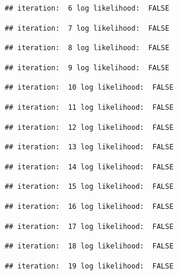 \documentclass[
]{article}
\begin{document}
\begin{lstlisting}
## iteration:  6 log likelihood:  FALSE
\end{lstlisting}

\begin{lstlisting}
## iteration:  7 log likelihood:  FALSE
\end{lstlisting}

\begin{lstlisting}
## iteration:  8 log likelihood:  FALSE
\end{lstlisting}

\begin{lstlisting}
## iteration:  9 log likelihood:  FALSE
\end{lstlisting}

\begin{lstlisting}
## iteration:  10 log likelihood:  FALSE
\end{lstlisting}

\begin{lstlisting}
## iteration:  11 log likelihood:  FALSE
\end{lstlisting}

\begin{lstlisting}
## iteration:  12 log likelihood:  FALSE
\end{lstlisting}

\begin{lstlisting}
## iteration:  13 log likelihood:  FALSE
\end{lstlisting}

\begin{lstlisting}
## iteration:  14 log likelihood:  FALSE
\end{lstlisting}

\begin{lstlisting}
## iteration:  15 log likelihood:  FALSE
\end{lstlisting}

\begin{lstlisting}
## iteration:  16 log likelihood:  FALSE
\end{lstlisting}

\begin{lstlisting}
## iteration:  17 log likelihood:  FALSE
\end{lstlisting}

\begin{lstlisting}
## iteration:  18 log likelihood:  FALSE
\end{lstlisting}

\begin{lstlisting}
## iteration:  19 log likelihood:  FALSE
\end{lstlisting}
\end{document}
